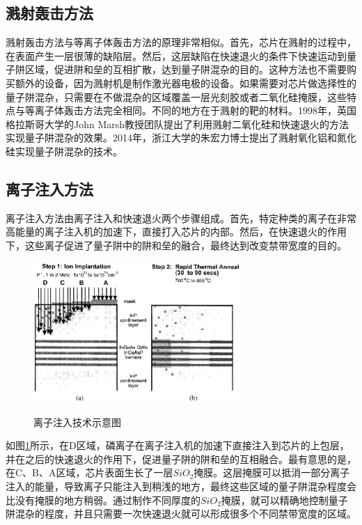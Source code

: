 \documentclass[oneside]{ZJUthesis}
\begin{document}
\subsection{溅射轰击方法}

溅射轰击方法与等离子体轰击方法的原理非常相似。首先，芯片在溅射的过程中，在表面产生一层很薄的缺陷层。然后，这层缺陷在快速退火的条件下快速运动到量子阱区域，促进阱和垒的互相扩散，达到量子阱混杂的目的。这种方法也不需要购买额外的设备，因为溅射机是制作激光器电极的设备。如果需要对芯片做选择性的量子阱混杂，只需要在不做混杂的区域覆盖一层光刻胶或者二氧化硅掩膜，这些特点与等离子体轰击方法完全相同。不同的地方在于溅射的靶的材料。1998年，英国格拉斯哥大学的John Marsh教授团队提出了利用溅射二氧化硅和快速退火的方法实现量子阱混杂的效果\cite{mcdougall1998monolithic}。2014年，浙江大学的朱宏力博士提出了溅射氧化铝\cite{zhu2014quantum}和氮化硅\cite{zhu2014bandgap}实现量子阱混杂的技术。

\subsection{离子注入方法}

离子注入方法由离子注入和快速退火两个步骤组成。首先，特定种类的离子在非常高能量的离子注入机的加速下，直接打入芯片的内部。然后，在快速退火的作用下，这些离子促进了量子阱中的阱和垒的融合，最终达到改变禁带宽度的目的。

\begin{figure}[!h]
  \centering
  \includegraphics[width=0.7\textwidth]{./Pictures/implantation.eps}\\
  \caption{离子注入技术示意图}
  \label{fig_implantation}
\end{figure}

如图\ref{fig_implantation}所示，在D区域，磷离子在离子注入机的加速下直接注入到芯片的上包层，并在之后的快速退火的作用下，促进量子阱的阱和垒的互相融合。最有意思的是，在C、B、A区域，芯片表面生长了一层$SiO_2$掩膜。这层掩膜可以抵消一部分离子注入的能量，导致离子只能注入到稍浅的地方，最终这些区域的量子阱混杂程度会比没有掩膜的地方稍弱。通过制作不同厚度的$SiO_2$掩膜，就可以精确地控制量子阱混杂的程度，并且只需要一次快速退火就可以形成很多个不同禁带宽度的区域。
\end{document}
